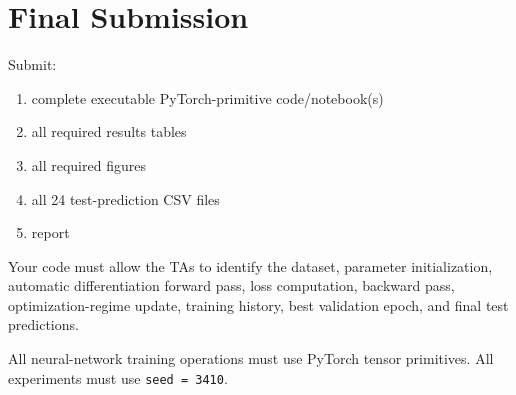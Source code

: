 \documentclass[11pt,a4paper]{article}
\newcommand{\code}[1]{\texttt{#1}}
\begin{document}
\section{Final Submission}

Submit:

\begin{enumerate}
    \item complete executable PyTorch-primitive code/notebook(s)
    \item all required results tables
    \item all required figures
    \item all 24 test-prediction CSV files
    \item report
\end{enumerate}

Your code must allow the TAs to identify the dataset, parameter initialization, automatic differentiation forward pass, loss computation, backward pass, optimization-regime update, training history, best validation epoch, and final test predictions.

All neural-network training operations must use PyTorch tensor primitives. All experiments must use \code{seed = 3410}.
\end{document}
